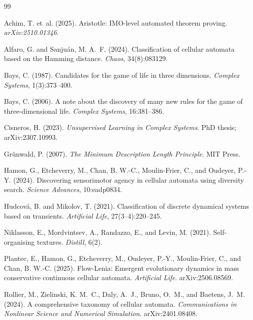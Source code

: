 \documentclass[letterpaper]{article}
\begin{document}
\clearpage
\footnotesize
\setlength{\bibsep}{2pt plus 0.3ex}

\begin{thebibliography}{99}

Achim, T. et~al. (2025).
Aristotle: {IMO}-level automated theorem proving.
\emph{arXiv:2510.01346}.

Alfaro, G. and Sanju{\'a}n, M. A.~F. (2024).
Classification of cellular automata based on the {H}amming distance.
\emph{Chaos}, 34(8):083129.

Bays, C. (1987).
Candidates for the game of life in three dimensions.
\emph{Complex Systems}, 1(3):373--400.

Bays, C. (2006).
A note about the discovery of many new rules for the game of three-dimensional life.
\emph{Complex Systems}, 16:381--386.

Cisneros, H. (2023).
\emph{Unsupervised Learning in Complex Systems}.
PhD thesis; arXiv:2307.10993.

Gr{\"u}nwald, P. (2007).
\emph{The Minimum Description Length Principle}. MIT Press.

Hamon, G., Etcheverry, M., Chan, B. W.-C., Moulin-Frier, C., and Oudeyer, P.-Y. (2024).
Discovering sensorimotor agency in cellular automata using diversity search.
\emph{Science Advances}, 10:eadp0834.

Hudcov{\'a}, B. and Mikolov, T. (2021).
Classification of discrete dynamical systems based on transients.
\emph{Artificial Life}, 27(3--4):220--245.

Niklasson, E., Mordvintsev, A., Randazzo, E., and Levin, M. (2021).
Self-organising textures.
\emph{Distill}, 6(2).

Plantec, E., Hamon, G., Etcheverry, M., Oudeyer, P.-Y., Moulin-Frier, C., and Chan, B. W.-C. (2025).
Flow-{L}enia: Emergent evolutionary dynamics in mass conservative continuous cellular automata.
\emph{Artificial Life}. arXiv:2506.08569.

Rollier, M., Zielinski, K. M.~C., Daly, A.~J., Bruno, O.~M., and Baetens, J.~M. (2024).
A comprehensive taxonomy of cellular automata.
\emph{Communications in Nonlinear Science and Numerical Simulation}. arXiv:2401.08408.


\end{thebibliography}
\end{document}
